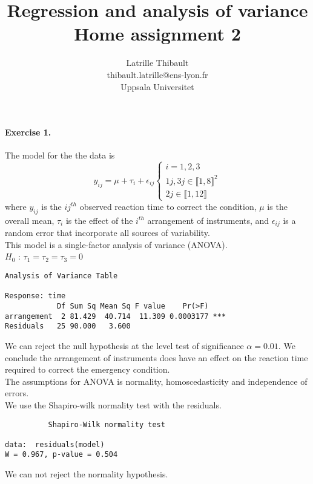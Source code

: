 \documentclass{article}
\author{Latrille Thibault\\
\small thibault.latrille@ens-lyon.fr\\[-0.8ex]
\small Uppsala Universitet\\}
\title{Regression and analysis of variance \\ Home assignment 2}
\begin{document}
\maketitle
\paragraph{Exercise 1.}
The model for the the data is $$
y_{ij}=\mu +\tau_i +\epsilon_{ij} \left \{
    \begin{array}{ll}
        i=1,2,3 \\
        1j, 3j  \in \llbracket 1,8 \rrbracket^2 \\
        2j  \in \llbracket 1,12 \rrbracket
    \end{array}
\right.
$$
where $y_{ij}$ is the $ij^{th}$ observed reaction time to correct the condition, $\mu$ is the overall mean, $\tau_i$ is the effect of the $i^{th}$ arrangement of instruments, and $\epsilon_{ij}$ is a random error that incorporate all sources of variability.\\

This model is a single-factor analysis of variance (ANOVA).\\
$H_0$ : $ \tau_1 = \tau_2 = \tau_3 =0$
\begin{verbatim}
Analysis of Variance Table

Response: time
            Df Sum Sq Mean Sq F value    Pr(>F)    
arrangement  2 81.429  40.714  11.309 0.0003177 ***
Residuals   25 90.000   3.600                      
\end{verbatim}
We can reject the null hypothesis at the level test of significance $\alpha=0.01$. We conclude the arrangement of instruments does have an effect on the reaction time required to correct the emergency condition. \\ 
The assumptions for ANOVA is normality, homoscedasticity and independence of errors.\\
We use the Shapiro-wilk normality test with the residuals.
\begin{verbatim}
          Shapiro-Wilk normality test

data:  residuals(model) 
W = 0.967, p-value = 0.504
\end{verbatim}
We can not reject the normality hypothesis. 
\end{document}
